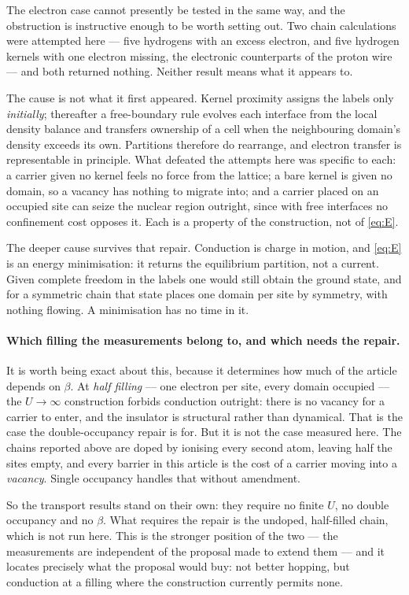 \documentclass[11pt]{article}
\begin{document}
The electron case cannot presently be tested in the same way, and the obstruction is instructive
enough to be worth setting out. Two chain calculations were attempted here --- five hydrogens with an
excess electron, and five hydrogen kernels with one electron missing, the electronic counterparts of
the proton wire --- and both returned nothing. Neither result means what it appears to.

The cause is not what it first appeared. Kernel proximity assigns the labels only \emph{initially};
thereafter a free-boundary rule evolves each interface from the local density balance and transfers
ownership of a cell when the neighbouring domain's density exceeds its own. Partitions therefore do
rearrange, and electron transfer is representable in principle. What defeated the attempts here was
specific to each: a carrier given no kernel feels no force from the lattice; a bare kernel is given no
domain, so a vacancy has nothing to migrate into; and a carrier placed on an occupied site can seize
the nuclear region outright, since with free interfaces no confinement cost opposes it. Each is a
property of the construction, not of \eqref{eq:E}.

The deeper cause survives that repair. Conduction is charge in motion, and \eqref{eq:E} is an energy
minimisation: it returns the equilibrium partition, not a current. Given complete freedom in the
labels one would still obtain the ground state, and for a symmetric chain that state places one
domain per site by symmetry, with nothing flowing. A minimisation has no time in it.

\paragraph{Which filling the measurements belong to, and which needs the repair.} It is worth being
exact about this, because it determines how much of the article depends on $\beta$. At \emph{half
filling} --- one electron per site, every domain occupied --- the $U\to\infty$ construction forbids
conduction outright: there is no vacancy for a carrier to enter, and the insulator is structural
rather than dynamical. That is the case the double-occupancy repair is for. But it is not the case
measured here. The chains reported above are doped by ionising every second atom, leaving half the
sites empty, and every barrier in this article is the cost of a carrier moving into a \emph{vacancy}.
Single occupancy handles that without amendment.

So the transport results stand on their own: they require no finite $U$, no double occupancy and no
$\beta$. What requires the repair is the undoped, half-filled chain, which is not run here. This is
the stronger position of the two --- the measurements are independent of the proposal made to extend
them --- and it locates precisely what the proposal would buy: not better hopping, but conduction at
a filling where the construction currently permits none.
\end{document}
